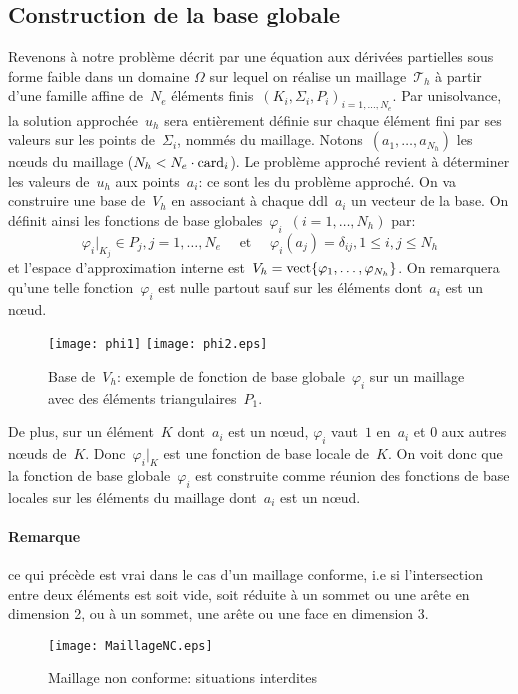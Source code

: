 \medskip
\subsection{Construction de la base globale}
Revenons à notre problème décrit par une équation aux dérivées partielles sous forme faible dans un domaine
$\Omega$ sur lequel on réalise un maillage~$\mathcal{T}_h$ à partir d'une famille affine
de~$N_e$ éléments finis~$(K_i, \Sigma_i, P_i)_{i=1,\ldots,N_e}$.
\medskip
Par unisolvance, la solution approchée~$u_h$ sera entièrement définie sur chaque élément fini
par ses valeurs sur les points de~$\Sigma_i$, nommés  du maillage.
Notons~$(a_1,\ldots, a_{N_h})$ les nœuds du maillage ($N_h<N_e \cdot \mathrm{card}_i$).
Le problème approché revient à déterminer les valeurs de~$u_h$ aux points~$a_i$:
ce sont les  du problème approché.
\medskip
On va construire une base de~$V_h$ en associant à chaque ddl~$a_i$ un vecteur de la base.
On définit ainsi les fonctions de base globales~$\varphi_i$~$(i = 1,\ldots, N_h)$ par:
\begin{equation}\varphi_i|_{K_j} \in P_j, j = 1,\ldots, N_e \quad \text{ et }\quad \varphi_i(a_j) = \delta_{ij}, 1\le i,j\le N_h\end{equation}
et l'espace d'approximation interne est~$V_h=\operatorname{vect}\{\varphi_1,\ldots, \varphi_{N_h}\}$.
On remarquera qu'une telle fonction~$\varphi_i$ est nulle partout sauf sur les éléments
dont~$a_i$ est un nœud.
\begin{figure}[ht]
\centering
\texttt{[image: phi1]} \hspace{5em} \texttt{[image: phi2.eps]}
\caption{\label{BaseVh} Base de~$V_h$: exemple de fonction de base globale~$\varphi_i$ sur un maillage avec des éléments triangulaires~$P_1$.}
\end{figure}

\medskip
De plus, sur un élément~$K$ dont~$a_i$ est un nœud, $\varphi_i$ vaut~$1$ en~$a_i$ et
$0$ aux autres nœuds de~$K$. Donc~$\varphi_i|_K$ est une fonction de base locale de~$K$.
On voit donc que la fonction de base globale~$\varphi_i$ est construite comme réunion des
fonctions de base locales sur les éléments du maillage dont~$a_i$ est un nœud.

\medskip
\paragraph{Remarque} ce qui précède est vrai dans le cas d'un maillage conforme, i.e si
l'intersection entre deux éléments est soit vide, soit réduite à un
sommet ou une arête en dimension 2, ou à un sommet, une arête ou une face
en dimension 3.
\begin{figure}[ht]
\centering
\texttt{[image: MaillageNC.eps]}
\caption{Maillage non conforme: situations interdites}\label{maillageNC}
\end{figure}

